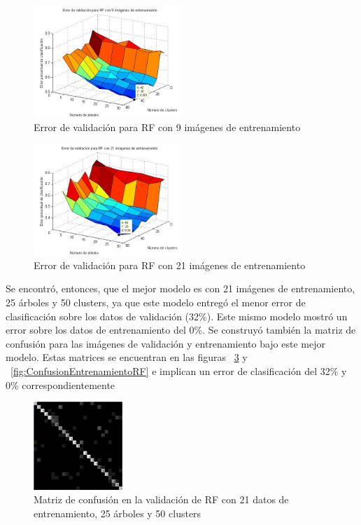 \documentclass[10pt,twocolumn,letterpaper]{article}
\begin{document}
\begin{figure}[h]
    \centering
    \includegraphics[width=0.5\textwidth]{ErrorValidacion9.jpg}
    \caption{Error de validación para RF con 9 imágenes de entrenamiento}
    \label{fig:errorValidacion9}
\end{figure}

\begin{figure}[h]
    \centering
    \includegraphics[width=0.5\textwidth]{ErrorValidacion21.jpg}
    \caption{Error de validación para RF con 21 imágenes de entrenamiento}
    \label{fig:errorValidacion21}
\end{figure}

Se encontró, entonces, que el mejor modelo es con 21 imágenes de entrenamiento, 25 árboles y 50 clusters, ya que este modelo entregó el menor error de clasificación sobre los datos de validación (32\%). Este mismo modelo mostró un error sobre los datos de entrenamiento del 0\%. Se construyó también la matriz de confusión para las imágenes de validación y entrenamiento bajo este mejor modelo. Estas matrices se encuentran en las figuras ~\ref{fig:ConfusionValidacionRF} y ~\ref{fig:ConfusionEntrenamientoRF} e implican un error de clasificación del 32\% y 0\% correspondientemente

\begin{figure}[h]
    \centering
    \includegraphics[width=0.3\textwidth]{ConfusionValidacionRF.jpg}
    \caption{Matriz de confusión en la validación de RF con 21 datos de entrenamiento, 25 árboles y 50 clusters}
    \label{fig:ConfusionValidacionRF}
\end{figure}
\end{document}
